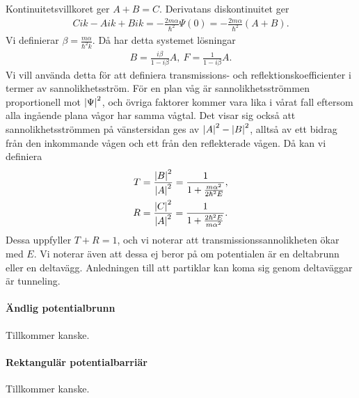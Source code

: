 Kontinuitetsvillkoret ger $A + B = C$. Derivatans diskontinuitet ger
\begin{align*}
	Cik - Aik + Bik = -\frac{2m\alpha}{\hbar^{2}}\Psi(0) = -\frac{2m\alpha}{\hbar^{2}}(A + B).
\end{align*}
Vi definierar $\beta = \frac{m\alpha}{\hbar^{2}k}$. Då har detta systemet lösningar
\begin{align*}
	B = \frac{i\beta}{1 - i\beta}A,\ F = \frac{1}{1 - i\beta}A.
\end{align*}
Vi vill använda detta för att definiera transmissions- och reflektionskoefficienter i termer av sannolikhetsström. För en plan våg är sannolikhetsströmmen proportionell mot $\abs{\Psi}^{2}$, och övriga faktorer kommer vara lika i vårat fall eftersom alla ingående plana vågor har samma vågtal. Det visar sig också att sannolikhetsströmmen på vänstersidan ges av $\abs{A}^{2} - \abs{B}^{2}$, alltså av ett bidrag från den inkommande vågen och ett från den reflekterade vågen. Då kan vi definiera
\begin{align*}
	T &= \frac{\abs{B}^{2}}{\abs{A}^{2}} = \frac{1}{1 + \frac{m\alpha^{2}}{2\hbar^{2}E}}, \\
	R &= \frac{\abs{C}^{2}}{\abs{A}^{2}} = \frac{1}{1 + \frac{2\hbar^{2}E}{m\alpha^{2}}}.
\end{align*}
Dessa uppfyller $T + R = 1$, och vi noterar att transmissionssannolikheten ökar med $E$. Vi noterar även att dessa ej beror på om potentialen är en deltabrunn eller en deltavägg. Anledningen till att partiklar kan koma sig genom deltaväggar är tunneling.

\paragraph{Ändlig potentialbrunn}
Tillkommer kanske.

\paragraph{Rektangulär potentialbarriär}
Tillkommer kanske.

